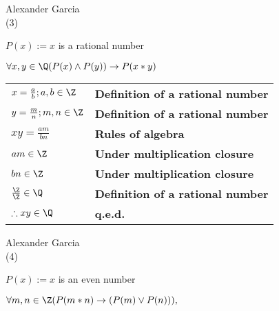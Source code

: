 \documentclass[]{article}
\def\OR{\vee}
\def\AND{\wedge}
\def\imp{\rightarrow}
\begin{document}
Alexander Garcia \\

\noindent (3)

$P(x) := x$ is a rational number

$\forall x, y \in \Q (P(x) \AND P(y)) \imp P(x*y)$ \\

\begin{tabular}{l l}
	$x = \frac{a}{b}; a, b \in \Z$ & \textbf{Definition of a rational number} \\

	$y = \frac{m}{n}; m, n \in \Z$ & \textbf{Definition of a rational number} \\

	$xy = \frac{am}{bn}$ & \textbf{Rules of algebra} \\

	$am \in \Z$ & \textbf{Under multiplication closure} \\

	$bn \in \Z$ & \textbf{Under multiplication closure} \\

	$\frac{\Z}{\Z} \in \Q$ & \textbf{Definition of a rational number} \\

	$\therefore xy \in \Q$ & \textbf{q.e.d.} \\
\end{tabular}

\newpage

Alexander Garcia \\

\noindent (4)

$P(x) := x$ is an even number

$\forall m, n \in \Z (P(m*n) \imp (P(m) \OR P(n))), $\\
\end{document}
